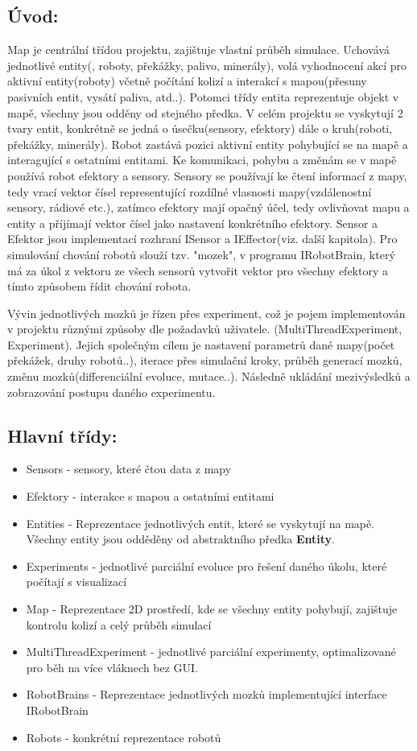 \subsection{Úvod:}
Map je centrální třídou projektu, zajištuje vlastní průběh simulace. Uchovává jednotlivé entity(, roboty,  překážky, palivo, minerály), volá vyhodnocení akcí pro aktivní entity(roboty) včetně počítání kolizí a interakcí s mapou(přesuny pasivních entit, vysátí paliva, atd..). Potomci třídy entita reprezentuje objekt v mapě, všechny jsou  odděny od stejného předka. V celém projektu se vyskytují 2 tvary entit, konkrétně se jedná o úsečku(sensory, efektory) dále o kruh(roboti, překážky, minerály). Robot zastává pozici aktivní entity pohybující se na mapě a interagující s ostatními entitami. Ke komunikaci, pohybu a změnám se v mapě používá robot efektory a sensory. Sensory se používají ke čtení informací z mapy, tedy vrací vektor čísel representující rozdílné vlasnosti mapy(vzdálenostní sensory, rádiové etc.), zatímco efektory mají opačný účel, tedy ovlivňovat mapu a entity a příjímají vektor čísel jako nastavení konkrétního efektory. Sensor a Efektor jsou implementací rozhraní ISensor a IEffector(viz. další kapitola). Pro simulování chování robotů slouží tzv. "mozek", v programu IRobotBrain, který má za úkol z vektoru ze všech sensorů vytvořit vektor pro všechny efektory a tímto způsobem řídit chování robota. \par
Vývin jednotlivých mozků je řízen přes experiment, což je pojem implementován v projektu různými způsoby dle požadavků uživatele. (MultiThreadExperiment, Experiment). Jejich společným cílem je nastavení parametrů dané mapy(počet překážek, druhy robotů..), iterace přes simulační kroky, průběh generací mozků, změnu mozků(differenciální evoluce, mutace..). Následně ukládání mezivýsledků a zobrazování postupu daného experimentu. 
\subsection{Hlavní třídy:}
\begin{itemize}
\item Sensors - sensory, které čtou data z  mapy 
\item Efektory - interakce s mapou a ostatními entitami
\item Entities - Reprezentace jednotlivých entit, které se vyskytují na mapě. Všechny entity jsou odděděny od abstraktního předka \textbf{Entity}. 
\item Experiments - jednotlivé parciální evoluce pro řešení daného úkolu, které počítají s visualizací
\item Map - Reprezentace 2D prostředí, kde se všechny entity pohybují, zajištuje kontrolu kolizí a celý průběh simulací
\item MultiThreadExperiment - jednotlivé parciální experimenty, optimalizované pro  běh na více vláknech bez GUI. 
\item RobotBrains - Reprezentace jednotlivých mozků implementující interface IRobotBrain
\item Robots - konkrétní reprezentace robotů 
\end{itemize}
\newpage
